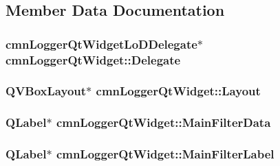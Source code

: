 \subsection{Member Data Documentation}
\hypertarget{classcmn_logger_qt_widget_aed99a9d6f4028323d23d6c08e07312bf}{
\subsubsection[{Delegate}]{\setlength{\rightskip}{0pt plus 5cm}cmn\-Logger\-Qt\-Widget\-Lo\-D\-Delegate$\ast$ cmn\-Logger\-Qt\-Widget\-::\-Delegate\hspace{0.3cm}{\ttfamily [protected]}}}\label{classcmn_logger_qt_widget_aed99a9d6f4028323d23d6c08e07312bf}
\hypertarget{classcmn_logger_qt_widget_ae6d9fe4654407a5437baefc5f5dfa127}{
\subsubsection[{Layout}]{\setlength{\rightskip}{0pt plus 5cm}Q\-V\-Box\-Layout$\ast$ cmn\-Logger\-Qt\-Widget\-::\-Layout\hspace{0.3cm}{\ttfamily [protected]}}}\label{classcmn_logger_qt_widget_ae6d9fe4654407a5437baefc5f5dfa127}
\hypertarget{classcmn_logger_qt_widget_aa992dc2ab13ca4a98518174e1a301ab7}{
\subsubsection[{Main\-Filter\-Data}]{\setlength{\rightskip}{0pt plus 5cm}Q\-Label$\ast$ cmn\-Logger\-Qt\-Widget\-::\-Main\-Filter\-Data\hspace{0.3cm}{\ttfamily [protected]}}}\label{classcmn_logger_qt_widget_aa992dc2ab13ca4a98518174e1a301ab7}
\hypertarget{classcmn_logger_qt_widget_abb1f3f5bb9a8e22bd4a30ce06e887fc7}{
\subsubsection[{Main\-Filter\-Label}]{\setlength{\rightskip}{0pt plus 5cm}Q\-Label$\ast$ cmn\-Logger\-Qt\-Widget\-::\-Main\-Filter\-Label\hspace{0.3cm}{\ttfamily [protected]}}}\label{classcmn_logger_qt_widget_abb1f3f5bb9a8e22bd4a30ce06e887fc7}
